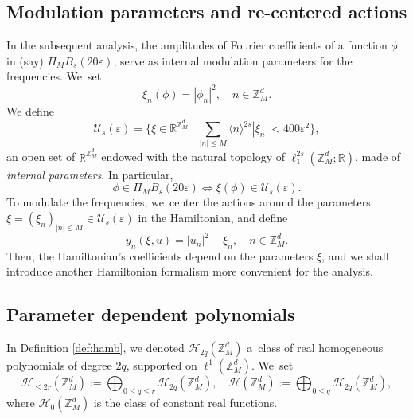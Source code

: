 \documentclass[JEP,XML,SOM,Unicode,published]{cedram}
\let\ts\textstyle
\theoremstyle{plain}
\theoremstyle{definition}
\newcommand{\Z}{\mathbb{Z}}
\newcommand{\R}{\mathbb{R}}
\newcommand{\1}{\mathbf{1}}
\let\epsilon\varepsilon
\begin{document}
\subsection{Modulation parameters and re-centered actions} In the subsequent analysis, the amplitudes of Fourier coefficients of a function $\phi$ in (say) $\Pi_{M}B_s(20\epsilon)$, serve as internal modulation parameters for the frequencies. We~set\vspace*{-3pt}
\[
\xi_n(\phi) = |\phi_n|^2,\quad n\in\Z_{M}^{d}.
\]
We define\vspace*{-3pt}
\begin{equation}
\label{eq:U-eps}\ts
\mathcal{U}_{s}(\epsilon) = \bigl\{ \xi \in \R^{\Z_{M}^{d}}\mid \sum_{|n|\leq M}\langle n\rangle^{2s}|\xi_{n}| < 400\epsilon^{2}
\bigr\},
\end{equation}
an open set of $\R^{\Z_{M}^{d}}$ endowed with the natural topology of $\ell_{1}^{2s}(\Z_{M}^{d};\R)$, made of \emph{internal parameters}. In particular,\vspace*{-3pt}
\[
\phi \in \Pi_{M}B_{s}(20\epsilon)\iff \xi(\phi) \in \mathcal{U}_{s}(\epsilon).
\]
To modulate the frequencies, we~center the actions around the parameters $\xi=(\xi_{n})_{|n|\leq M}\in\mathcal{U}_{s}(\epsilon)$ in the Hamiltonian, and define\vspace*{-3pt}
\[
y_{n}(\xi,u) = |u_{n}|^{2} - \xi_{n},\quad n\in\Z_{M}^{d}.
\]
Then, the Hamiltonian's coefficients depend on the parameters $\xi$, and we shall introduce another Hamiltonian formalism more convenient for the analysis.
\subsection{Parameter dependent polynomials}
\label{sub:par}

In Definition \ref{def:hamb}, we denoted $\mathcal{H}_{2q}(\Z_{M}^{d})$ a~class of real homogeneous polynomials of degree $2q$, supported on $\ell^{1}(\Z_{M}^{d})$. We~set\vspace*{-3pt}
\[
\mathcal{H}_{\leq 2r}(\Z_{M}^{d})
:= \bigoplus_{0\leq q\leq r }
\mathcal{H}_{2q}(\Z_{M}^{d}),
\quad \mathcal{H}(\Z_{M}^{d})
:= \bigoplus_{0\leq q}
\mathcal{H}_{2q}(\Z_{M}^{d}),
\]
where $\mathcal{H}_{0}(\Z_{M}^{d})$ is the class of constant real functions.
\end{document}
